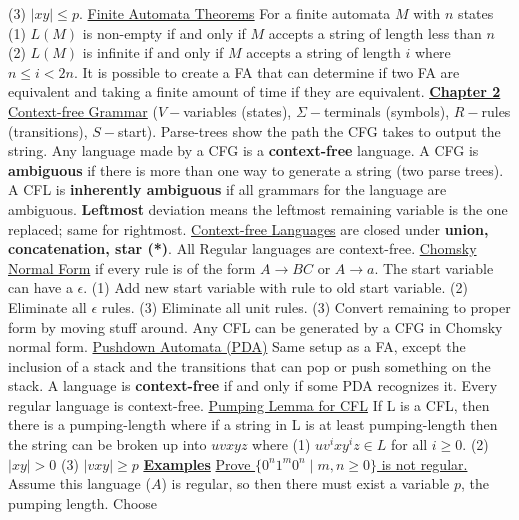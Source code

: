 \documentclass[9pt]{article}
\begin{document}
(3) $|xy| \leq p$.\newline
\uline{Finite Automata Theorems} For a finite automata $M$ with $n$ states (1) $L(M)$ 
is non-empty if and only if $M$ accepts a string of length less than $n$ (2) $L(M)$ is 
infinite if and only if $M$ accepts a string of length $i$ where $n\leq i < 2n$. It is
possible to create a FA that can determine if two FA are equivalent and taking a 
finite amount of time if they are equivalent.\newline
\noindent\uline{\textbf{Chapter 2}}\newline
\uline{Context-free Grammar} ($V-$variables (states), $\Sigma-$terminals (symbols), 
$R-$rules (transitions), $S-$start). Parse-trees show the path the CFG takes to output
the string. Any language made by a CFG is a \textbf{context-free} language. A CFG is
\textbf{ambiguous} if there is more than one way to generate a string (two parse trees). 
A CFL is \textbf{inherently ambiguous} if all grammars for the language are ambiguous. 
\textbf{Leftmost} deviation means the leftmost remaining variable is the one replaced; 
same for rightmost.\newline
\uline{Context-free Languages} are closed under \textbf{union, concatenation, star (*)}. 
All Regular languages are context-free.\newline
\uline{Chomsky Normal Form} if every rule is of the form $A\rightarrow BC$ or 
$A\rightarrow a$. The start variable can have a $\epsilon$. (1) Add new start variable 
with rule to old start variable. (2) Eliminate all $\epsilon$ rules. (3) Eliminate all
unit rules. (3) Convert remaining to proper form by moving stuff around. Any CFL can be 
generated by a CFG in Chomsky normal form.\newline
\uline{Pushdown Automata (PDA)} Same setup as a FA, except the inclusion of a stack
and the transitions that can pop or push something on the stack. A language is 
\textbf{context-free} if and only if some PDA recognizes it. Every regular language is
context-free.\newline
\uline{Pumping Lemma for CFL} If L is a CFL, then there is a pumping-length where if
a string in L is at least pumping-length then the string can be broken up into $uvxyz$
where (1) $uv^ixy^iz \in L$ for all $i\geq 0$. (2) $|xy|>0$ (3) $|vxy|\geq p$\newline
\uline{\textbf{Examples}}\newline
\uline{Prove $\{0^n1^m0^n \mid m,n \geq 0\}$ is not regular.} Assume this language 
($A$) is regular, so then there must exist a variable $p$, the pumping length. Choose 
\end{document}
